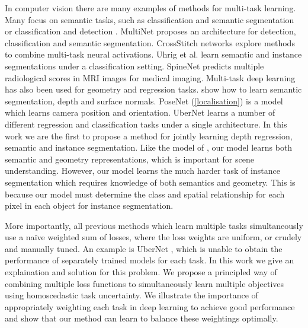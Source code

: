 In computer vision there are many examples of methods for multi-task learning. Many focus on semantic tasks, such as classification and semantic segmentation \citep{liao2016understand} or classification and detection \citep{sermanet2013overfeat,roddick2018orthographic}. MultiNet \citep{teichmann2016multinet} proposes an architecture for detection, classification and semantic segmentation. CrossStitch networks \citep{misra2016cross} explore methods to combine multi-task neural activations. Uhrig et al. \citep{uhrig2016pixel} learn semantic and instance segmentations under a classification setting. SpineNet \citep{jamaludin2016spinenet} predicts multiple radiological scores in MRI images for medical imaging. Multi-task deep learning has also been used for geometry and regression tasks. \citep{eigen2015predicting} show how to learn semantic segmentation, depth and surface normals. PoseNet (\cref{localisation}) is a model which learns camera position and orientation. UberNet \citep{kokkinos2016ubernet} learns a number of different regression and classification tasks under a single architecture. In this work we are the first to propose a method for jointly learning depth regression, semantic and instance segmentation. Like the model of \citet{eigen2015predicting}, our model learns both semantic and geometry representations, which is important for scene understanding. However, our model learns the much harder task of instance segmentation which requires knowledge of both semantics and geometry. This is because our model must determine the class and spatial relationship for each pixel in each object for instance segmentation.

More importantly, all previous methods which learn multiple tasks simultaneously use a na{\"i}ve weighted sum of losses, where the loss weights are uniform, or crudely and manually tuned. An example is UberNet \citep{kokkinos2016ubernet}, which is unable to obtain the performance of separately trained models for each task. In this work we give an explaination and solution for this problem. We propose a principled way of combining multiple loss functions to simultaneously learn multiple objectives using homoscedastic task uncertainty. We illustrate the importance of appropriately weighting each task in deep learning to achieve good performance and show that our method can learn to balance these weightings optimally.




